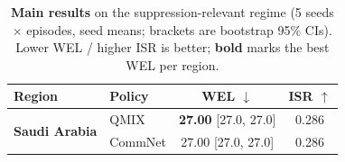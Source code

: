 \begin{table}[t]
\centering
\caption{\textbf{Main results} on the suppression-relevant regime (5 seeds $\times$ episodes, seed means; brackets are bootstrap 95\% CIs). Lower WEL / higher ISR is better; \textbf{bold} marks the best WEL per region.}
\label{tab:main_results}
\begin{tabular}{llcc}
\toprule
Region & Policy & WEL $\downarrow$ & ISR $\uparrow$ \\
\midrule
\multirow{2}{*}{\textbf{Saudi Arabia}}
& QMIX & \textbf{27.00} \small{[27.0, 27.0]} & 0.286 \\
& CommNet & 27.00 \small{[27.0, 27.0]} & 0.286 \\
\bottomrule
\end{tabular}
\end{table}
